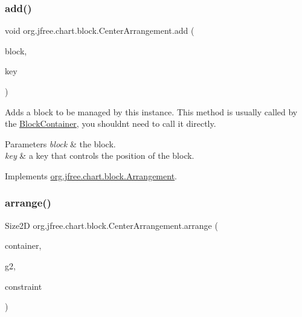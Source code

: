 \subsubsection{\texorpdfstring{add()}{add()}}
{\footnotesize\ttfamily void org.\+jfree.\+chart.\+block.\+Center\+Arrangement.\+add (\begin{DoxyParamCaption}\item[{\mbox{\hyperlink{interfaceorg_1_1jfree_1_1chart_1_1block_1_1_block}{Block}}}]{block,  }\item[{Object}]{key }\end{DoxyParamCaption})}

Adds a block to be managed by this instance. This method is usually called by the \mbox{\hyperlink{classorg_1_1jfree_1_1chart_1_1block_1_1_block_container}{Block\+Container}}, you shouldn\textquotesingle{}t need to call it directly.


\begin{DoxyParams}{Parameters}
{\em block} & the block. \\
\hline
{\em key} & a key that controls the position of the block. \\
\hline
\end{DoxyParams}


Implements \mbox{\hyperlink{interfaceorg_1_1jfree_1_1chart_1_1block_1_1_arrangement_ab9ba94da0c30233584985ff29d88b489}{org.\+jfree.\+chart.\+block.\+Arrangement}}.

\mbox{\label{classorg_1_1jfree_1_1chart_1_1block_1_1_center_arrangement_aad8b951e9f858ccab0c021bc4a36407b}} 
\subsubsection{\texorpdfstring{arrange()}{arrange()}}
{\footnotesize\ttfamily Size2D org.\+jfree.\+chart.\+block.\+Center\+Arrangement.\+arrange (\begin{DoxyParamCaption}\item[{\mbox{\hyperlink{classorg_1_1jfree_1_1chart_1_1block_1_1_block_container}{Block\+Container}}}]{container,  }\item[{Graphics2D}]{g2,  }\item[{\mbox{\hyperlink{classorg_1_1jfree_1_1chart_1_1block_1_1_rectangle_constraint}{Rectangle\+Constraint}}}]{constraint }\end{DoxyParamCaption})}

